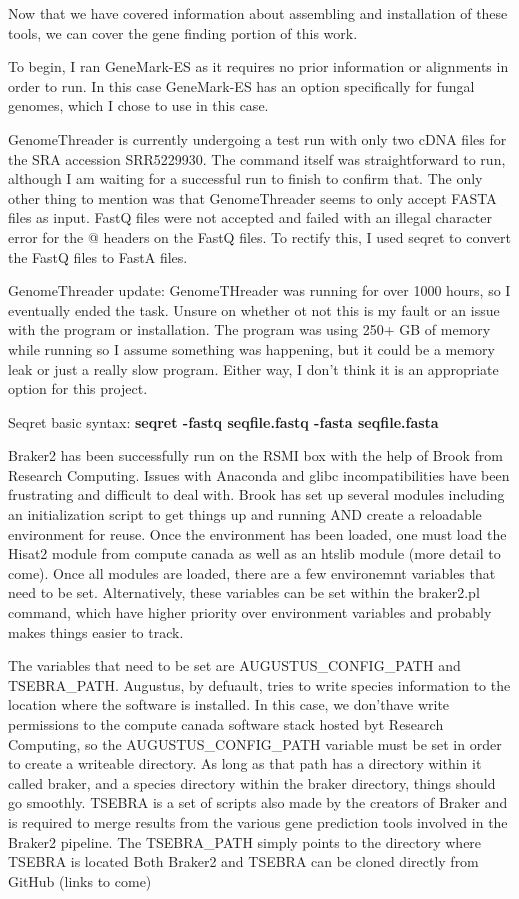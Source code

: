 \documentclass[12pt]{article}
\begin{document}
Now that we have covered information about assembling and installation
of these tools, we can cover the gene finding portion of this work.

To begin, I ran GeneMark-ES as it requires no prior information or
alignments in order to run. In this case GeneMark-ES has an option
specifically for fungal genomes, which I chose to use in this case.


GenomeThreader is currently undergoing a test run with only two cDNA
files for the SRA accession SRR5229930. The command itself was
straightforward to run, although I am waiting for a successful run to
finish to confirm that. The only other thing to mention was that
GenomeThreader seems to only accept FASTA files as input. FastQ files
were not accepted and failed with an illegal character error for the @
headers on the FastQ files. To rectify this, I used seqret to convert
the FastQ files to FastA files.

GenomeThreader update: GenomeTHreader was running for over 1000 hours,
so I eventually ended the task. Unsure on whether ot not this is my
fault or an issue with the program or installation. The program was
using 250+ GB of memory while running so I assume something was
happening, but it could be a memory leak or just a really slow
program. Either way, I don't think it is an appropriate option for
this project.

Seqret basic syntax:
\textbf{seqret -fastq seqfile.fastq -fasta seqfile.fasta}


Braker2 has been successfully run on the RSMI box with the help of
Brook from Research Computing. Issues with Anaconda and glibc
incompatibilities have been frustrating and difficult to deal
with. Brook has set up several modules including an initialization
script to get things up and running AND create a reloadable
environment for reuse. Once the environment has been loaded, one must
load the Hisat2 module from compute canada as well as an htslib module
(more detail to come). Once all modules are loaded, there are a few
environemnt variables that need to be set. Alternatively, these
variables can be set within the braker2.pl command, which have higher
priority over environment variables and probably makes things easier
to track.

The variables that need to be set are AUGUSTUS\_CONFIG\_PATH and
TSEBRA\_PATH. Augustus, by defuault, tries to write species
information to the location where the software is installed. In this
case, we don'thave write permissions to the compute canada software
stack hosted byt Research Computing, so the AUGUSTUS\_CONFIG\_PATH
variable must be set in order to create a writeable directory. As long
as that path has a directory within it called braker, and a species
directory within the braker directory, things should go
smoothly. TSEBRA is a set of scripts also made by the creators of
Braker and is required to merge results from the various gene
prediction tools involved in the Braker2 pipeline. The TSEBRA\_PATH
simply points to the directory where TSEBRA is located Both Braker2
and TSEBRA can be cloned directly from GitHub (links to come)
\end{document}
